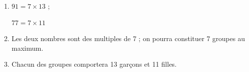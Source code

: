 \medskip

%
%

\begin{enumerate}
\item %
$91 = 7 \times 13$ ;

$77 = 7 \times 11$
\item %

Les deux nombres sont des multiples de 7 ; on pourra constituer 7 groupes au maximum.
\item %
Chacun des groupes comportera 13 garçons et 11 filles.
\end{enumerate}
